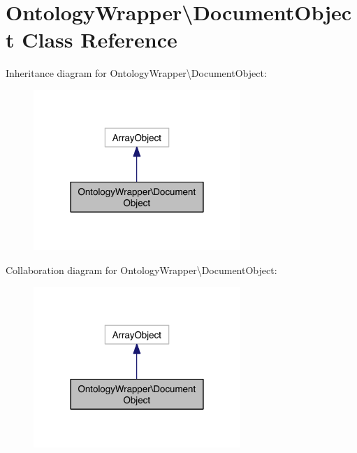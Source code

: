 \hypertarget{class_ontology_wrapper_1_1_document_object}{\section{Ontology\-Wrapper\textbackslash{}Document\-Object Class Reference}
\label{class_ontology_wrapper_1_1_document_object}
}


Inheritance diagram for Ontology\-Wrapper\textbackslash{}Document\-Object\-:
\nopagebreak
\begin{figure}[H]
\begin{center}
\leavevmode
\includegraphics[width=222pt]{class_ontology_wrapper_1_1_document_object__inherit__graph}
\end{center}
\end{figure}


Collaboration diagram for Ontology\-Wrapper\textbackslash{}Document\-Object\-:
\nopagebreak
\begin{figure}[H]
\begin{center}
\leavevmode
\includegraphics[width=222pt]{class_ontology_wrapper_1_1_document_object__coll__graph}
\end{center}
\end{figure}
